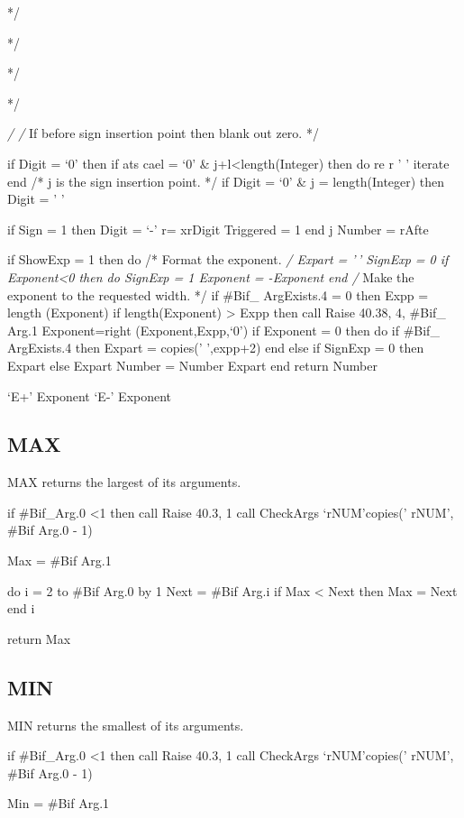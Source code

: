 */

*/

*/

*/

\emph{/ /} If before sign insertion point then blank out zero. */

if Digit = `0' then if ats cael = `0' \& j+l\textless length(Integer)
then do re r ' ' iterate end /* j is the sign insertion point. */ if
Digit = `0' \& j = length(Integer) then Digit = ' '

if Sign = 1 then Digit = `-' r= xr\textbar\textbar Digit Triggered = 1
end j Number = r\textbar\textbar Afte

if ShowExp = 1 then do /* Format the exponent. \emph{/ Expart = '\,'
SignExp = 0 if Exponent\textless0 then do SignExp = 1 Exponent =
-Exponent end /} Make the exponent to the requested width. */ if \#Bif\_
ArgExists.4 = 0 then Expp = length (Exponent) if length(Exponent)
\textgreater{} Expp then call Raise 40.38, 4, \#Bif\_ Arg.1
Exponent=right (Exponent,Expp,`0') if Exponent = 0 then do if \#Bif\_
ArgExists.4 then Expart = copies(' ',expp+2) end else if SignExp = 0
then Expart else Expart Number = Number \textbar{} \textbar Expart end
return Number

`E+' Exponent `E-' Exponent

\hypertarget{max}{%
\subsection{MAX}\label{max}}

MAX returns the largest of its arguments.

if \#Bif\_Arg.0 \textless1 then call Raise 40.3, 1 call CheckArgs
`rNUM'\textbar\textbar copies(' rNUM', \#Bif Arg.0 - 1)

Max = \#Bif Arg.1

do i = 2 to \#Bif Arg.0 by 1 Next = \#Bif Arg.i if Max \textless{} Next
then Max = Next end i

return Max

\hypertarget{min}{%
\subsection{MIN}\label{min}}

MIN returns the smallest of its arguments.

if \#Bif\_Arg.0 \textless1 then call Raise 40.3, 1 call CheckArgs
`rNUM'\textbar\textbar copies(' rNUM', \#Bif Arg.0 - 1)

Min = \#Bif Arg.1

